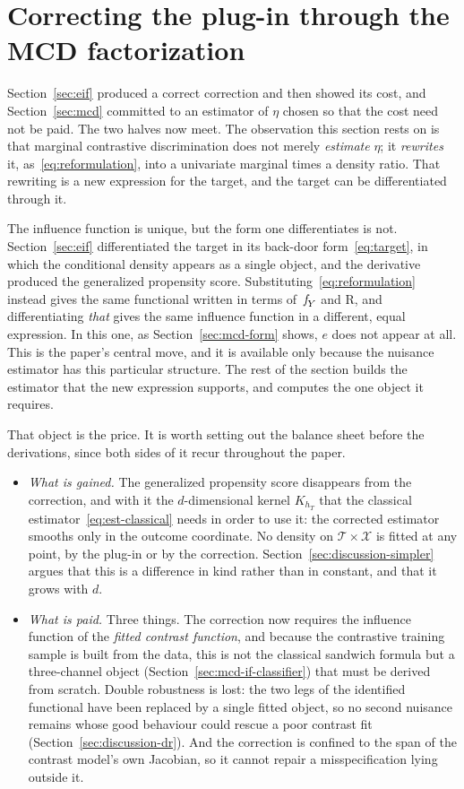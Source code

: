 \documentclass[11pt]{article}
\theoremstyle{plain}
\theoremstyle{definition}
\theoremstyle{remark}
\newcommand{\cX}{\ensuremath{\mathcal{X}}}
\newcommand{\cT}{\ensuremath{\mathcal{T}}}
\newcommand{\pf}[1]{\ensuremath{\,\mathlarger{\textit{f}}_{#1}}}
\newcommand{\DensityRatio}{\text{R}}
\newcommand{\gps}{e}
\begin{document}
\section{Correcting the plug-in through the MCD factorization}
\label{sec:mcd-correction}

Section~\ref{sec:eif} produced a correct correction and then showed its cost, and
Section~\ref{sec:mcd} committed to an estimator of $\eta$ chosen so that the cost need not be
paid. The two halves now meet. The observation this section rests on is that marginal
contrastive discrimination does not merely \emph{estimate} $\eta$; it \emph{rewrites} it,
as~\eqref{eq:reformulation}, into a univariate marginal times a density ratio. That rewriting
is a new expression for the target, and the target can be differentiated through it.

The influence function is unique, but the form one differentiates is not. Section~\ref{sec:eif}
differentiated the target in its back-door form~\eqref{eq:target}, in which the conditional
density appears as a single object, and the derivative produced the generalized propensity
score. Substituting~\eqref{eq:reformulation} instead gives the same functional written in terms
of $\pf{Y}$ and $\DensityRatio$, and differentiating \emph{that} gives the same influence
function in a different, equal expression. In this one, as
Section~\ref{sec:mcd-form} shows, $\gps$ does not appear at all. This is the paper's central
move, and it is available only because the nuisance estimator has this particular structure.
The rest of the section builds the estimator that the new expression supports, and computes the
one object it requires.

That object is the price. It is worth setting out the balance sheet before the derivations,
since both sides of it recur throughout the paper.

\begin{itemize}
\item \emph{What is gained.} The generalized propensity score disappears from the correction,
and with it the $d$-dimensional kernel $K_{h_T}$ that the classical
estimator~\eqref{eq:est-classical} needs in order to use it: the corrected estimator smooths
only in the outcome coordinate. No density on $\cT\times\cX$ is fitted at any point, by the
plug-in or by the correction. Section~\ref{sec:discussion-simpler} argues that this is a
difference in kind rather than in constant, and that it grows with $d$.
\item \emph{What is paid.} Three things. The correction now requires the influence function of
the \emph{fitted contrast function}, and because the contrastive training sample is built from
the data, this is not the classical sandwich formula but a three-channel object
(Section~\ref{sec:mcd-if-classifier}) that must be derived from scratch. Double robustness is
lost: the two legs of the identified functional have been replaced by a single fitted object,
so no second nuisance remains whose good behaviour could rescue a poor contrast fit
(Section~\ref{sec:discussion-dr}). And the correction is confined to the span of the contrast
model's own Jacobian, so it cannot repair a misspecification lying outside it.
\end{itemize}
\end{document}
